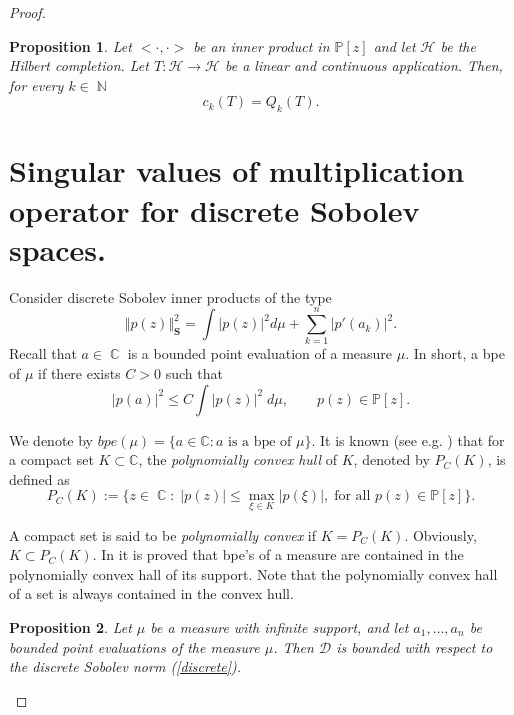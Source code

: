\documentclass[12pt]{amsart}
\theoremstyle{definition}
\theoremstyle{plain}
\newtheorem{prop}{Proposition}
\theoremstyle{remark}
\DeclareMathOperator{\CC}{\mathbb C}
\DeclareMathOperator{\NN}{\mathbb N}
\begin{document}
\begin{proof}
\begin{prop} Let $<\cdot,\cdot>$ be an inner product in $\mathbb{P}[z]$ and let $\mathcal{H}$ be the Hilbert completion. Let $T: \mathcal{H} \to \mathcal{H}$ be a linear and continuous application. Then, for every $k\in \NN$
$$
c_{k}(T)=Q_k(T).
$$



    
\end{prop}




\section{Singular values of multiplication operator for discrete Sobolev spaces.}

\noindent Consider discrete Sobolev inner products of the type
\begin{equation} \label{discrete}
\Vert p(z) \Vert^2_{\mathbf{S}}= \int \vert p(z) \vert^{2} d\mu + \sum_{k=1}^{n} \vert p'(a_k) \vert^{2}.
\end{equation}
\noindent Recall that $a\in \CC$ is a bounded point evaluation of a measure $\mu$. In short, a bpe of $\mu$ if there exists $C>0$ such that $$ \vert p (a) \vert^2 \leq C \int \vert p(z) \vert^2 \; d\mu, \qquad p(z)\in \mathbb{P}[z].
$$


\noindent We denote by $bpe(\mu)= \{a\in \mathbb{C}: a \text{ is a bpe of  }  \mu\}$. It is known  (see e.g.   \cite{Conway}) that 
for a compact set $K\subset \mathbb{C}$, the {\it polynomially convex 
hull } of $K$, denoted by $P_C{(K)}$, is defined as
$$
P_C(K):=\{ z\in \CC:  \; \vert p(z) \vert \leq \max_{\xi \in K}\vert p(\xi) \vert,  \; \text{for all } p(z)\in \mathbb{P}[z] \}.
$$

\noindent A compact set is said to be {\it polynomially convex} if $K=P_C(K)$. Obviously, $K \subset P_C(K)$. In \cite{EG2} it is proved that bpe's of a measure are contained in the polynomially convex hall of its support. Note that the polynomially convex hall of a set is always contained in the convex hull. 

\begin{prop} Let $\mu$ be a measure with infinite support, and let 
$a_1,\dots ,a_n$ be bounded point evaluations of the measure $\mu$.  Then $\mathcal{D}$ is bounded with respect to the discrete Sobolev norm (\ref{discrete}). 
\end{prop}



 



\end{proof}
\end{document}
